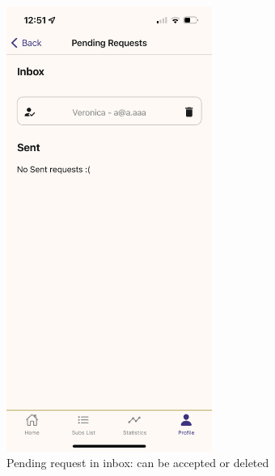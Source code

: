 \documentclass[12pt]{article}
\begin{document}
\begin{figure}[h!]
    \centering
    \begin{minipage}[c]{0.45\textwidth}
        \centering
        \includegraphics[width=0.6\textwidth, clip]{../../assets/smartphone/pendingIn.PNG}
        \caption{Pending request in inbox: can be accepted or deleted}
        \label{fig:pendingIn}
    \end{minipage}\hspace{1cm}%
    \begin{minipage}[c]{0.45\textwidth}
        \centering

\end{minipage}
\end{figure}
\end{document}
